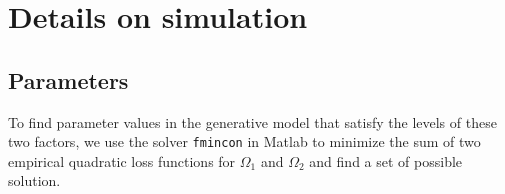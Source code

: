 \documentclass[12pt]{article}
\newcommand{\wh}{\widehat}
\newcommand{\itl}{\intercal}
\newcommand{\bs}{ \boldsymbol}
\newcommand{\lt}{\left}
\newcommand{\rt}{\right}
\newtheorem{theorem}{Theorem}[section]
\begin{document}
%
\section{Details on simulation }
\subsection{Parameters}
To find parameter values in the generative model that satisfy the levels of these two factors, we use the solver \texttt{fmincon} in Matlab to minimize the sum of two empirical quadratic loss functions for $\Omega_1$ and $\Omega_2$ and find a set of possible solution. \\
\end{document}
